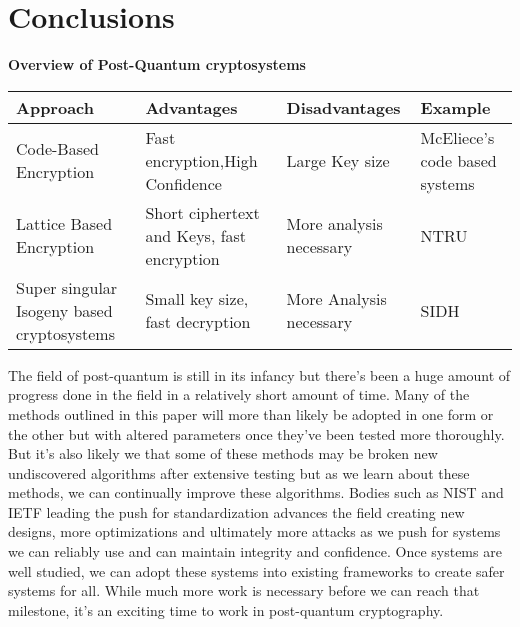 \documentclass[10pt,a4paper]{article}
\begin{document}
\section{Conclusions}
\begin{center}
	\textbf{Overview of Post-Quantum cryptosystems}
	\begin{tabular}{ | m{5cm} | m{5cm} | m{3cm} | m{3cm} | }
		\hline
		Approach & Advantages & Disadvantages & Example \\
		\hline
		Code-Based Encryption & Fast encryption,High Confidence & Large Key size & McEliece's code based systems\\
		\hline
		Lattice Based Encryption & Short ciphertext and Keys, fast encryption & More analysis necessary & NTRU \\
		\hline
		Super singular Isogeny based cryptosystems &Small key size, fast decryption &More Analysis necessary & SIDH \\
		\hline
	\end{tabular}
\end{center}
The field of post-quantum is still in its infancy but there's been a huge amount of progress done in the field in a relatively short amount of time. Many of the methods outlined in this paper will more than likely be adopted in one form or the other but with altered parameters once they've been tested more thoroughly. But it's also likely we that some of these methods may be broken new undiscovered algorithms after extensive testing but as we learn about these methods, we can continually improve these algorithms. Bodies such as NIST and IETF leading the push for standardization advances the field creating new designs, more optimizations and ultimately more attacks as we push for systems we can reliably use and can maintain integrity and confidence. Once systems are well studied, we can adopt these systems into existing frameworks to create safer systems for all. While much more work is necessary before we can reach that milestone, it's an exciting time to work in post-quantum cryptography. 
\end{document}
